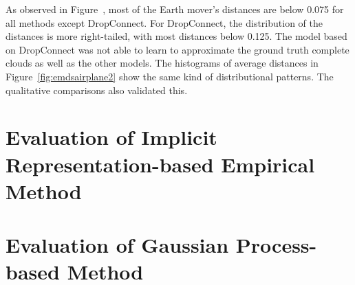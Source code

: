         As observed in Figure~\label{fig:emdsairplane1}, most of the Earth mover's distances are below 0.075 for all methods except DropConnect. For DropConnect, the distribution of the distances is more right-tailed, with most distances below 0.125. The model based on DropConnect was not able to learn to approximate the ground truth complete clouds as well as the other models. The histograms of average distances in Figure~\ref{fig:emdsairplane2} show the same kind of distributional patterns. The qualitative comparisons also validated this.


\section{Evaluation of Implicit Representation-based Empirical Method}
    


\section{Evaluation of Gaussian Process-based Method}